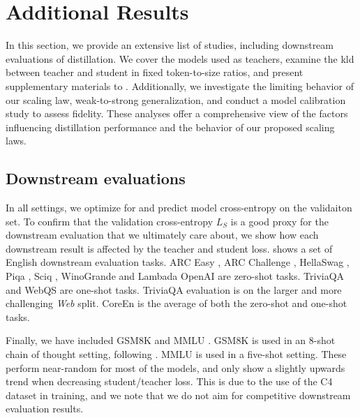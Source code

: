 \clearpage
\section{Additional Results}
\label{sec:additional-results}

In this section, we provide an extensive list of studies, including downstream evaluations of distillation. We cover the models used as teachers, examine the \gls{kld} between teacher and student in fixed token-to-size ratios, and present supplementary materials to . Additionally, we investigate the limiting behavior of our scaling law, weak-to-strong generalization, and conduct a model calibration study to assess fidelity. These analyses offer a comprehensive view of the factors influencing distillation performance and the behavior of our proposed scaling laws.

\subsection{Downstream evaluations}
\label{ssec:downstream-evaluations}

In all settings, we optimize for and predict model cross-entropy on the validaiton set. 
To confirm that the validation cross-entropy $L_S$ is a good proxy for the downstream evaluation that we ultimately care about, we show how each downstream result is affected by the teacher and student loss.
 shows a set of English downstream evaluation tasks. ARC Easy \citep{DBLP:journals/corr/abs-2102-03315}, ARC Challenge \citep{DBLP:journals/corr/abs-2102-03315}, HellaSwag \citep{DBLP:conf/acl/ZellersHBFC19}, Piqa \citep{DBLP:conf/aaai/BiskZLGC20}, Sciq \citep{DBLP:conf/aclnut/WelblLG17}, WinoGrande \citep{DBLP:journals/cacm/SakaguchiBBC21} and Lambada OpenAI \citep{DBLP:conf/acl/PapernoKLPBPBBF16} are zero-shot tasks. TriviaQA \citep{DBLP:conf/acl/JoshiCWZ17} and WebQS \citep{DBLP:conf/emnlp/BerantCFL13} are one-shot tasks. TriviaQA evaluation is on the larger and more challenging \emph{Web} split. 
CoreEn is the average of both the zero-shot and one-shot tasks.

Finally, we have included GSM8K \citep{DBLP:journals/corr/abs-2110-14168} and MMLU \citep{DBLP:conf/iclr/HendrycksBBZMSS21,DBLP:conf/iclr/HendrycksBBC0SS21}. GSM8K is used in an 8-shot chain of thought setting, following \llama \citep{DBLP:journals/corr/abs-2302-13971,DBLP:journals/corr/abs-2307-09288,DBLP:journals/corr/abs-2407-21783}. MMLU is used in a five-shot setting. 
These perform near-random for most of the models, and only show a slightly upwards trend when decreasing student/teacher loss. 
This is due to the use of the C4 dataset in training, and we note that we do not aim for competitive downstream evaluation results.

